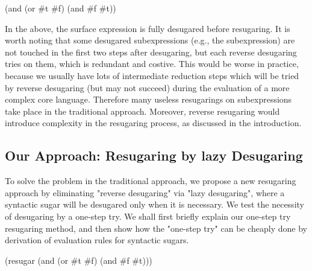 \begin{Codes}
    (and (or \#t \#f) (and \#f \#t))
 
\end{Codes}

In the above, the surface expression is fully desugared before resugaring. It is worth noting that some desugared subexpressions (e.g., the  subexpression) are not touched in the first two steps after desugaring, but each reverse desugaring tries on them, which is redundant and costive. This would be worse in practice, because we usually have lots of intermediate reduction steps which will be tried by reverse desugaring (but  may not succeed) during the evaluation of a more complex core language. Therefore many useless resugarings on subexpressions take place in the traditional approach. Moreover, reverse resugaring would introduce complexity in the resugaring process, as discussed in the introduction.

\subsection{Our Approach: Resugaring by lazy Desugaring}

To solve the problem in the traditional approach, we propose a new resugaring approach by eliminating "reverse desugaring" via "lazy desugaring", where a syntactic sugar will be desugared only when it is necessary. We test the necessity of desugaring by a one-step try. We shall first briefly explain our one-step try resugaring method, and then show how the "one-step try" can be cheaply done by derivation of evaluation rules for syntactic sugars.
\begin{Codes}
    (resugar (and (or \#t \#f) (and \#f \#t)))
 
 
\end{Codes}

